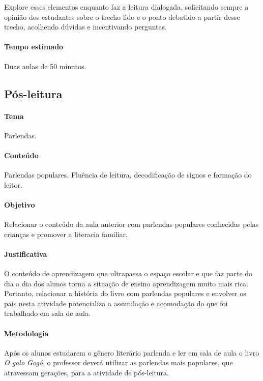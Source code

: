 \documentclass[11pt]{extarticle}
\begin{document}
Explore esses elementos enquanto faz a leitura dialogada, solicitando sempre a opinião dos estudantes sobre o trecho lido e o ponto debatido a partir desse trecho, acolhendo dúvidas e incentivando perguntas.

\paragraph{Tempo estimado} Duas aulas de 50 minutos.

\subsection{Pós-leitura}

\paragraph{Tema} Parlendas.

\paragraph{Conteúdo} Parlendas populares. Fluência de leitura, decodificação de signos e formação do leitor.


\paragraph{Objetivo} Relacionar o conteúdo da aula anterior com parlendas populares conhecidas pelas crianças e promover a literacia familiar.


\paragraph{Justificativa} O  conteúdo de aprendizagem que ultrapassa o espaço escolar e que faz parte do dia a dia dos alunos torna a situação de ensino aprendizagem muito mais rica. Portanto, relacionar a história do livro com parlendas populares e envolver os pais nesta atividade potencializa a assimilação e acomodação do que foi trabalhado em sala de aula. 

\paragraph{Metodologia} Após os alunos estudarem o gênero literário parlenda e ler em sala de aula o livro \textit{O galo Gogó}, o professor deverá utilizar as parlendas mais populares, que atravessam gerações, para a atividade de pós-leitura.
\end{document}
